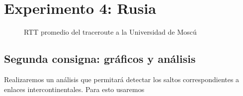\section{Experimento 4: Rusia}
\begin{figure}[H]
  \centering
  \caption{RTT promedio del traceroute a la Universidad de Moscú}
  \label{rusiaTTL}
\end{figure}



\subsection{Segunda consigna: gráficos y análisis}



Realizaremos un análisis que permitará detectar los saltos correspondientes a enlaces intercontinentales. Para esto usaremos 


